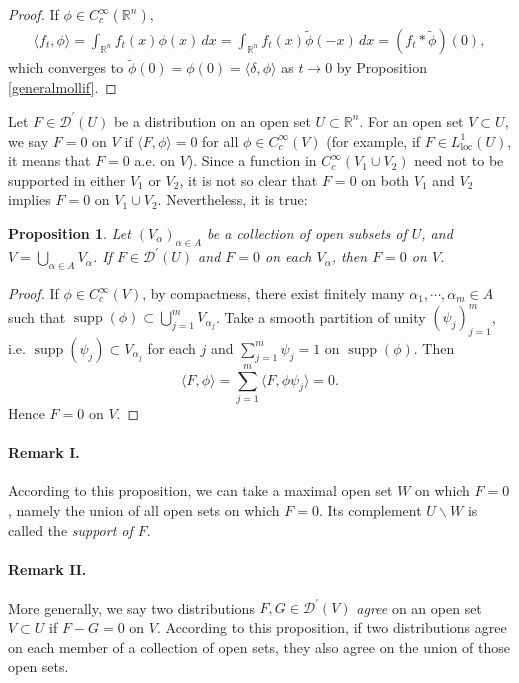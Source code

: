 \documentclass{article}
\numberwithin{equation}{section}
\newcommand{\bbR}{\mathbb{R}}
\renewcommand{\cal}{\mathcal}
\newcommand{\loc}{\mathrm{loc}}
\newcommand{\wt}{\widetilde}
\DeclareMathOperator{\supp}{supp}
\theoremstyle{plain}
\newtheorem{proposition}[theorem]{Proposition}
\theoremstyle{definition}
\begin{document}
\begin{proof}
If $\phi\in C_c^\infty(\bbR^n)$, \vspace{-0.1cm}
\begin{align*}
	\langle f_t,\phi\rangle=\int_{\bbR^n}f_t(x)\phi(x)\,dx=\int_{\bbR^n}f_t(x)\wt\phi(-x)\,dx=(f_t*\wt\phi)(0),
\end{align*}
which converges to $\wt\phi(0)=\phi(0)=\langle\delta,\phi\rangle$ as $t\to 0$ by Proposition \ref{generalmollif}.
\end{proof}

Let $F\in\cal{D}^\prime(U)$ be a distribution on an open set $U\subset\bbR^n$. For an open set $V\subset U$, we say $F=0$ on $V$ if $\langle F,\phi\rangle =0$ for all $\phi\in C_c^\infty(V)$ (for example, if $F\in L^1_\loc(U)$, it means that $F=0$ a.e. on $V$).  Since a function in $C_c^\infty(V_1\cup V_2)$ need not to be supported in either $V_1$ or $V_2$, it is not so clear that $F=0$ on both $V_1$ and $V_2$ implies $F=0$ on $V_1\cup V_2$. Nevertheless, it is true:
\begin{proposition}
Let $(V_\alpha)_{\alpha\in A}$ be a collection of open subsets of $U$, and $V=\bigcup_{\alpha\in A}V_\alpha$. If $F\in\cal{D}^\prime(U)$ and $F=0$ on each $V_\alpha$, then $F=0$ on $V$.
\end{proposition}
\begin{proof}
If $\phi\in C_c^\infty(V)$, by compactness, there exist finitely many $\alpha_1,\cdots,\alpha_m\in A$ such that $\supp(\phi)\subset\bigcup_{j=1}^m V_{\alpha_j}$. Take a smooth partition of unity $(\psi_j)_{j=1}^m$, i.e. $\supp(\psi_j)\subset V_{\alpha_j}$ for each $j$ and $\sum_{j=1}^m\psi_j=1$ on $\supp(\phi)$. Then \vspace{-0.05cm} $$\langle F,\phi\rangle=\sum_{j=1}^m\langle F,\phi\psi_j\rangle=0.$$
Hence $F=0$ on $V$.
\end{proof}
\paragraph{Remark I.} According to this proposition, we can take a maximal open set $W$ on which $F=0$, namely the union of all open sets on which $F=0$. Its complement $U\backslash W$ is called the \textit{support of $F$}.
\paragraph{Remark II.} More generally, we say two distributions $F,G\in\cal{D}^\prime(V)$ \textit{agree} on an open set $V\subset U$ if $F-G=0$ on $V$. According to this proposition, if two distributions agree on each member of a collection of open sets, they also agree on the union of those open sets.
\end{document}
